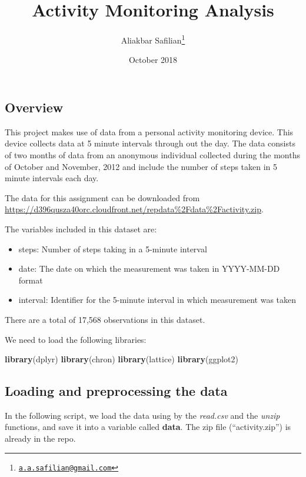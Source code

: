 \documentclass[]{article}
\title{Activity Monitoring Analysis}
\author{Aliakbar Safilian\footnote{\href{mailto:a.a.safilian@gmail.com}{\nolinkurl{a.a.safilian@gmail.com}}}}
\date{October 2018}
\newenvironment{Shaded}{\begin{snugshade}}{\end{snugshade}}
\newcommand{\KeywordTok}[1]{\textcolor[rgb]{0.13,0.29,0.53}{\textbf{#1}}}
\newcommand{\NormalTok}[1]{#1}
\providecommand{\tightlist}{%
  \setlength{\itemsep}{0pt}\setlength{\parskip}{0pt}}
\begin{document}
\maketitle

\subsection{Overview}\label{overview}

This project makes use of data from a personal activity monitoring
device. This device collects data at 5 minute intervals through out the
day. The data consists of two months of data from an anonymous
individual collected during the months of October and November, 2012 and
include the number of steps taken in 5 minute intervals each day.

The data for this assignment can be downloaded from
\url{https://d396qusza40orc.cloudfront.net/repdata\%2Fdata\%2Factivity.zip}.

The variables included in this dataset are:

\begin{itemize}
\tightlist
\item
  steps: Number of steps taking in a 5-minute interval\\
\item
  date: The date on which the measurement was taken in YYYY-MM-DD format
\item
  interval: Identifier for the 5-minute interval in which measurement
  was taken
\end{itemize}

There are a total of 17,568 observations in this dataset.

We need to load the following libraries:

\begin{Shaded}
\begin{Highlighting}[]
\KeywordTok{library}\NormalTok{(dplyr)}
\KeywordTok{library}\NormalTok{(chron)}
\KeywordTok{library}\NormalTok{(lattice)}
\KeywordTok{library}\NormalTok{(ggplot2)}
\end{Highlighting}
\end{Shaded}

\subsection{Loading and preprocessing the
data}\label{loading-and-preprocessing-the-data}

In the following script, we load the data using by the \emph{read.csv}
and the \emph{unzip} functions, and save it into a variable called
\textbf{data}. The zip file (``activity.zip'') is already in the repo.
\end{document}
